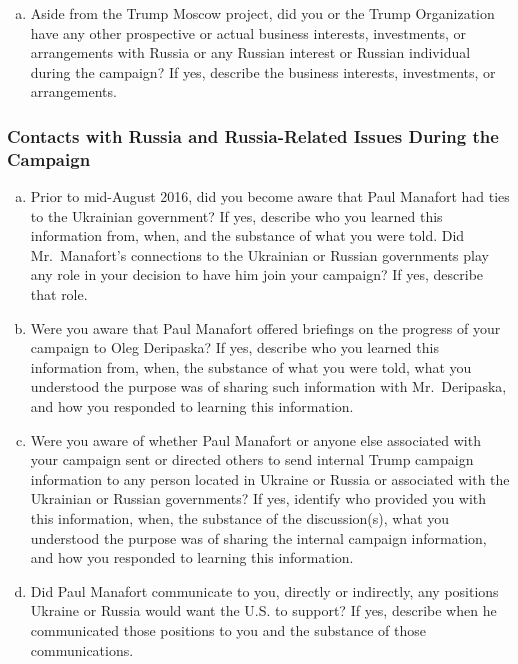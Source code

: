 \begin{enumerate}[a.]
\item Aside from the Trump Moscow project, did you or the Trump Organization have any other prospective or actual business interests, investments, or arrangements with Russia or any Russian interest or Russian individual during the campaign?
If yes, describe the business interests, investments, or arrangements.

\end{enumerate}

\subsubsection{Contacts with Russia and Russia-Related Issues During the Campaign}

\begin{enumerate}[a.]

\item Prior to mid-August 2016, did you become aware that Paul Manafort had ties to the Ukrainian government?
If yes, describe who you learned this information from, when, and the substance of what you were told.
Did Mr.~Manafort's connections to the Ukrainian or Russian governments play any role in your decision to have him join your campaign?
If yes, describe that role.

\item Were you aware that Paul Manafort offered briefings on the progress of your campaign to Oleg Deripaska?
If yes, describe who you learned this information from, when, the substance of what you were told, what you understood the purpose was of sharing such information with Mr.~Deripaska, and how you responded to learning this information.

\item Were you aware of whether Paul Manafort or anyone else associated with your campaign sent or directed others to send internal Trump campaign information to any person located in Ukraine or Russia or associated with the Ukrainian or Russian governments?
If yes, identify who provided you with this information, when, the substance of the discussion(s), what you understood the purpose was of sharing the internal campaign information, and how you responded to learning this information.

\item Did Paul Manafort communicate to you, directly or indirectly, any positions Ukraine or Russia would want the U.S. to support?
If yes, describe when he communicated those positions to you and the substance of those communications.


\end{enumerate}

